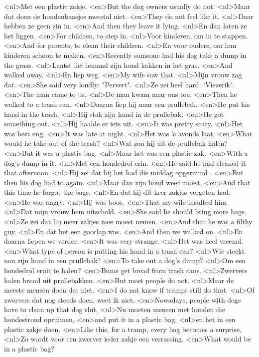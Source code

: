 <nl>Met een plastic zakje.
<en>But the dog owners usually do not.
<nl>Maar dat doen de hondenbaasjes meestal niet.
<en>They do not feel like it.
<nl>Daar hebben ze geen zin in.
<en>And then they leave it lying.
<nl>En dan laten ze het liggen.
<en>For children, to step in.
<nl>Voor kinderen, om in te stappen.
<en>And for parents, to clean their children.
<nl>En voor ouders, om hun kinderen schoon te maken.
<en>Recently someone had his dog take a dump in the grass.
<nl>Laatst liet iemand zijn hond kakken in het gras.
<en>And walked away.
<nl>En liep weg.
<en>My wife saw that.
<nl>Mijn vrouw zag dat.
<en>She said very loudly: "Pervert".
<nl>Ze zei heel hard: `Viezerik'.
<en>The man came to us.
<nl>De man kwam naar ons toe.
<en>Then he walked to a trash can.
<nl>Daarna liep hij naar een prullebak.
<en>He put his hand in the trash.
<nl>Hij stak zijn hand in de prullebak.
<en>He got something out.
<nl>Hij haalde er iets uit.
<en>It was pretty scary.
<nl>Het was best eng.
<en>It was late at night.
<nl>Het was 's avonds laat.
<en>What would he take out of the trash?
<nl>Wat zou hij uit de prullebak halen?
<en>But it was a plastic bag.
<nl>Maar het was een plastic zak.
<en>With a dog's dump in it.
<nl>Met een hondedrol erin.
<en>He said he had  cleaned it that afternoon.
<nl>Hij zei dat hij het had die middag opgeruimd .
<en>But then his dog had to again.
<nl>Maar dan zijn hond weer moest.
<en>And that this time he forgot the bags.
<nl>En dat hij dit keer zakjes vergeten had.
<en>He was angry.
<nl>Hij was boos.
<en>That my wife insulted him.
<nl>Dat mijn vrouw hem uitschold.
<en>She said he should bring more bags.
<nl>Ze zei dat hij meer zakjes mee moest nemen.
<en>And that he  was a filthy guy.
<nl>En dat het een goorlap was.
<en>And then we walked on.
<nl>En daarna liepen we verder.
<en>It was very strange.
<nl>Het was heel vreemd.
<en>What type of person is putting his hand in a trash can?
<nl>Wie steekt nou zijn hand in een prullebak?
<en>To take out a dog's dump?
<nl>Om een hondedrol eruit te halen?
<en>Bums get bread from trash cans.
<nl>Zwervers halen brood uit prullebakken.
<en>But most people do not.
<nl>Maar de meeste mensen doen dat niet.
<en>I do not know if tramps still do that.
<nl>Of zwervers dat nog steeds doen, weet ik niet.
<en>Nowadays, people with dogs have to clean up that dog shit,
<nl>Nu moeten mensen met honden die hondestrond opruimen,
<en>and put it in a plastic bag.
<nl>en het in een plastic zakje doen.
<en>Like this, for a tramp, every bag becomes a surprise.
<nl>Zo wordt voor een zwerver ieder zakje  een verrassing.
<en>What would be in a plastic bag?
